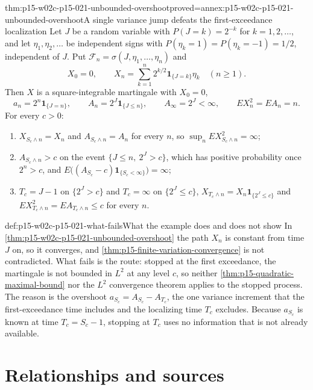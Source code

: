 \begin{hbtheorem}{thm:p15-w02c-p15-021-unbounded-overshoot}{proved=annex:p15-w02c-p15-021-unbounded-overshoot}{A single variance jump defeats the first-exceedance localization}
Let \(J\) be a random variable with \(P(J=k)=2^{-k}\) for
\(k=1,2,\ldots\), and let \(\eta_1,\eta_2,\ldots\) be independent
signs with \(P(\eta_k=1)=P(\eta_k=-1)=1/2\), independent of \(J\). Put
\(\mathcal F_n=\sigma(J,\eta_1,\ldots,\eta_n)\) and
\[
 X_0=0,\qquad
 X_n=\sum_{k=1}^n2^{k/2}\mathbf1_{\{J=k\}}\eta_k\quad(n\geq1).
\]
Then \(X\) is a square-integrable martingale with \(X_0=0\),
\[
 a_n=2^n\mathbf1_{\{J=n\}},\qquad
 A_n=2^J\mathbf1_{\{J\leq n\}},\qquad
 A_\infty=2^J<\infty,\qquad
 EX_n^2=EA_n=n .
\]
For every \(c>0\):
\begin{enumerate}
\item \(X_{S_c\wedge n}=X_n\) and \(A_{S_c\wedge n}=A_n\) for every
\(n\), so \(\sup_nEX_{S_c\wedge n}^2=\infty\);
\item \(A_{S_c\wedge n}>c\) on the event \(\{J\leq n,\ 2^J>c\}\),
which has positive probability once \(2^n>c\), and
\(E\bigl((A_{S_c}-c)\mathbf1_{\{S_c<\infty\}}\bigr)=\infty\);
\item \(T_c=J-1\) on \(\{2^J>c\}\) and \(T_c=\infty\) on
\(\{2^J\leq c\}\), \(X_{T_c\wedge n}=X_n\mathbf1_{\{2^J\leq c\}}\) and
\(EX_{T_c\wedge n}^2=EA_{T_c\wedge n}\leq c\) for every \(n\).
\end{enumerate}
\end{hbtheorem}

\begin{hbwarning}{def:p15-w02c-p15-021-what-fails}{What the example does and does not show}
In \cref{thm:p15-w02c-p15-021-unbounded-overshoot} the path \(X_n\) is
constant from time \(J\) on, so it converges, and
\cref{thm:p15-finite-variation-convergence} is not contradicted. What
fails is the route: stopped at the first exceedance, the martingale is
not bounded in \(L^2\) at any level \(c\), so neither
\cref{thm:p15-quadratic-maximal-bound} nor the \(L^2\) convergence
theorem applies to the stopped process. The reason is the overshoot
\(a_{S_c}=A_{S_c}-A_{T_c}\), the one variance increment that the
first-exceedance time includes and the localizing time \(T_c\) excludes.
Because \(a_{S_c}\) is known at time \(T_c=S_c-1\), stopping at \(T_c\)
uses no information that is not already available.
\end{hbwarning}

\section{Relationships and sources}
\label{sec:p15-w02c-p15-021-relations}

